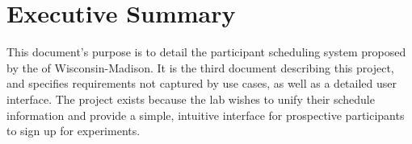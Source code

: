 \newcommand{\puttitle}{Milestone 3}


\section{Executive Summary}
This document's purpose is to detail the participant scheduling system proposed by the  of Wisconsin-Madison. It is the third document describing this project, and specifies requirements not captured by use cases, as well as a detailed user interface.  The project exists because the lab wishes to unify their schedule information and provide a simple, intuitive interface for prospective participants to sign up for experiments.








